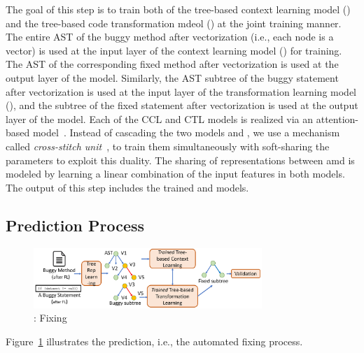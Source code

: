 The goal of this step is to train both of the tree-based context
learning model () and the tree-based code transformation
mdeol () at the joint training manner. The entire AST of the
buggy method after vectorization (i.e., each node is a vector) is used
at the input layer of the context learning model () for
training. The AST of the corresponding fixed method after
vectorization is used at the output layer of the 
model. Similarly, the AST subtree of the buggy statement after
vectorization is used at the input layer of the transformation
learning model (), and the subtree of the fixed statement
after vectorization is used at the output layer of the 
model. Each of the CCL and CTL models is realized via an
attention-based  model~\cite{yi}. Instead of cascading
the two models  and , we use a mechanism called
{\em cross-stitch unit}~\cite{misra2016cross}, to train them
simultaneously with soft-sharing the parameters to exploit this
duality. The sharing of representations between  amd
 is modeled by learning a linear combination of the input
features in both models. The output of this step includes the trained
 and  models.

\subsection{Prediction Process}

\begin{figure}[t]
	\centering
	\includegraphics[width=3.4in]{graphs/overview-predict.png}
	\caption{{\tool}: Fixing}
	\label{overview-fixing}
\end{figure}

Figure~\ref{overview-fixing} illustrates the prediction, i.e., the
automated fixing process. 
